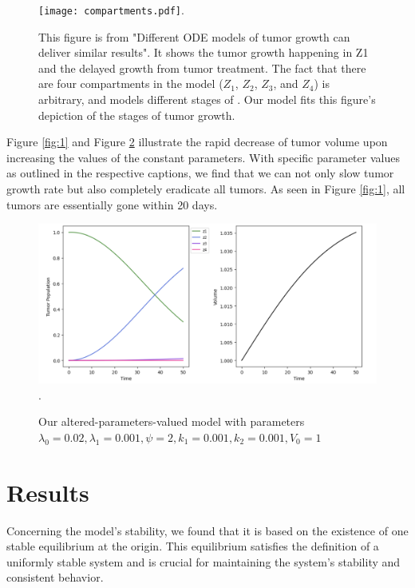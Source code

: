 \documentclass[11pt,reqno]{amsart}
\begin{document}
\begin{figure}[h]
\begin{center} %
\texttt{[image: compartments.pdf]}. %
\caption{This figure is from "Different ODE models of tumor growth can deliver similar results"\cite{Koziol_Falls_Schnitzer_2020}. It shows the tumor growth happening in Z1 and the delayed growth from tumor treatment. The fact that there are four compartments in the model ($Z_1$, $Z_2$, $Z_3$, and $Z_4$) is arbitrary, and models different stages of . Our model fits this figure's depiction of the stages of tumor growth.}
\end{center}
\label{fig:4}
\end{figure}



Figure \ref{fig:1} and Figure \ref{fig:5} illustrate the rapid decrease of tumor volume upon increasing the values of the constant parameters. With specific parameter values as outlined in the respective captions, we find that we can not only slow tumor growth rate but also completely eradicate all tumors. As seen in Figure \ref{fig:1}, all tumors are essentially gone within 20 days.

\begin{figure}[h]
\begin{center} %
\includegraphics[width=\textwidth]{altered.png}. %
\end{center}
\caption{Our altered-parameters-valued model with parameters $\lambda_0=0.02, \lambda_1=0.001, \psi=2, k_1 = 0.001, k_2=0.001, V_0 = 1$}
\label{fig:5}
\end{figure}



\section{Results}
Concerning the model’s stability, we found that it is based on the existence of one stable equilibrium at the origin. This equilibrium satisfies the definition of a uniformly stable system and is crucial for maintaining the system's stability and consistent behavior. 
\end{document}
